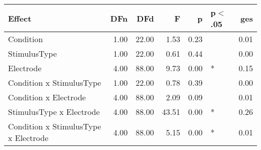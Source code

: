 \begin{table}[ht]
\centering
\begin{tabulary}{\textwidth}{lrrrrlr}
  \toprule
Effect & DFn & DFd & F & p & p$<$.05 & ges \\ 
  \midrule
Condition & 1.00 & 22.00 & 1.53 & 0.23 &  & 0.01 \\ 
  StimulusType & 1.00 & 22.00 & 0.61 & 0.44 &  & 0.00 \\ 
  Electrode & 4.00 & 88.00 & 9.73 & 0.00 & * & 0.15 \\ 
  Condition x StimulusType & 1.00 & 22.00 & 0.78 & 0.39 &  & 0.00 \\ 
  Condition x Electrode & 4.00 & 88.00 & 2.09 & 0.09 &  & 0.01 \\ 
  StimulusType x Electrode & 4.00 & 88.00 & 43.51 & 0.00 & * & 0.26 \\ 
  Condition x StimulusType x Electrode & 4.00 & 88.00 & 5.15 & 0.00 & * & 0.01 \\ 
   \bottomrule
\end{tabulary}
\end{table}

